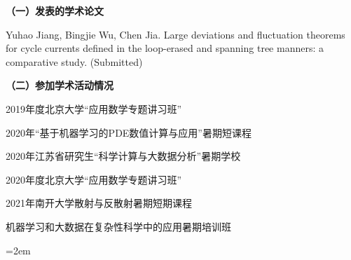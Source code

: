 
\setlength{\parindent}{0em}
\textbf{（一）发表的学术论文}
\begin{publist}
\item Yuhao Jiang, Bingjie Wu, Chen Jia. Large deviations and fluctuation theorems for cycle currents defined in the loop-erased and spanning tree manners: a comparative study. (Submitted)
\end{publist}

\textbf{（二）参加学术活动情况}
\begin{publist}
\item 2019年度北京大学“应用数学专题讲习班”
\item 2020年“基于机器学习的PDE数值计算与应用”暑期短课程
\item 2020年江苏省研究生“科学计算与大数据分析”暑期学校
\item 2020年度北京大学“应用数学专题讲习班”
\item 2021年南开大学散射与反散射暑期短期课程
\item 机器学习和大数据在复杂性科学中的应用暑期培训班
\end{publist}
\vfill
{}\hangindent=2em\noindent

\setlength{\parindent}{2em}

